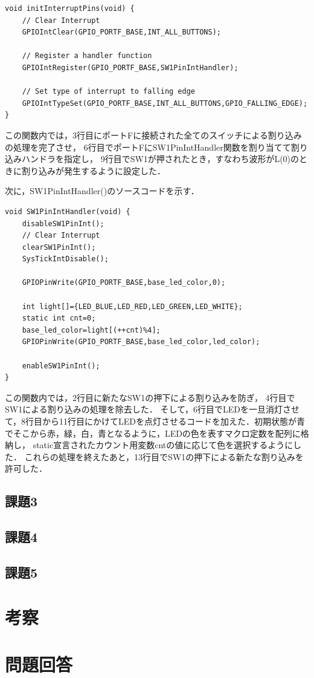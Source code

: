 \documentclass{jlreq}
\begin{document}
\begin{lstlisting}[label=src1,caption={initInterruptPins()}]
void initInterruptPins(void) {
    // Clear Interrupt
    GPIOIntClear(GPIO_PORTF_BASE,INT_ALL_BUTTONS);

    // Register a handler function
    GPIOIntRegister(GPIO_PORTF_BASE,SW1PinIntHandler);

    // Set type of interrupt to falling edge
    GPIOIntTypeSet(GPIO_PORTF_BASE,INT_ALL_BUTTONS,GPIO_FALLING_EDGE);
}
\end{lstlisting}

この関数内では，3行目にポートFに接続された全てのスイッチによる割り込みの処理を完了させ，
6行目でポートFにSW1PinIntHandler関数を割り当てて割り込みハンドラを指定し，
9行目でSW1が押されたとき，すなわち波形がL(0)のときに割り込みが発生するように設定した．

次に，SW1PinIntHandler()のソースコードを示す．

\begin{lstlisting}[label=src2,caption={SW1PinIntHandler()}]
void SW1PinIntHandler(void) {
    disableSW1PinInt();
    // Clear Interrupt
    clearSW1PinInt();
    SysTickIntDisable();

    GPIOPinWrite(GPIO_PORTF_BASE,base_led_color,0);

    int light[]={LED_BLUE,LED_RED,LED_GREEN,LED_WHITE};
    static int cnt=0;
    base_led_color=light[(++cnt)%4];
    GPIOPinWrite(GPIO_PORTF_BASE,base_led_color,led_color);

    enableSW1PinInt();
}
\end{lstlisting}

この関数内では，2行目に新たなSW1の押下による割り込みを防ぎ，
4行目でSW1による割り込みの処理を除去した．
そして，6行目でLEDを一旦消灯させて，8行目から11行目にかけてLEDを点灯させるコードを加えた．初期状態が青でそこから赤，緑，白，青となるように，LEDの色を表すマクロ定数を配列に格納し，
static宣言されたカウント用変数cntの値に応じて色を選択するようにした．
これらの処理を終えたあと，13行目でSW1の押下による新たな割り込みを許可した．

\subsection{課題3}

\subsection{課題4}

\subsection{課題5}

\section{考察}

\section{問題回答}
\end{document}
